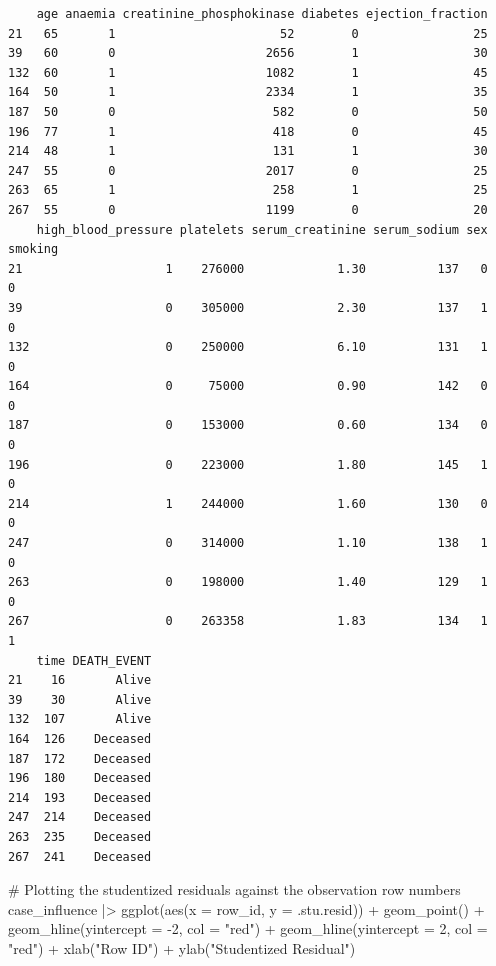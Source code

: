\documentclass[
  letterpaper,
  DIV=11,
  numbers=noendperiod]{scrartcl}
\newenvironment{Shaded}{\begin{snugshade}}{\end{snugshade}}
\newcommand{\AttributeTok}[1]{\textcolor[rgb]{0.40,0.45,0.13}{#1}}
\newcommand{\CommentTok}[1]{\textcolor[rgb]{0.37,0.37,0.37}{#1}}
\newcommand{\DecValTok}[1]{\textcolor[rgb]{0.68,0.00,0.00}{#1}}
\newcommand{\FunctionTok}[1]{\textcolor[rgb]{0.28,0.35,0.67}{#1}}
\newcommand{\NormalTok}[1]{\textcolor[rgb]{0.00,0.23,0.31}{#1}}
\newcommand{\SpecialCharTok}[1]{\textcolor[rgb]{0.37,0.37,0.37}{#1}}
\newcommand{\StringTok}[1]{\textcolor[rgb]{0.13,0.47,0.30}{#1}}
\begin{document}
\begin{verbatim}
    age anaemia creatinine_phosphokinase diabetes ejection_fraction
21   65       1                       52        0                25
39   60       0                     2656        1                30
132  60       1                     1082        1                45
164  50       1                     2334        1                35
187  50       0                      582        0                50
196  77       1                      418        0                45
214  48       1                      131        1                30
247  55       0                     2017        0                25
263  65       1                      258        1                25
267  55       0                     1199        0                20
    high_blood_pressure platelets serum_creatinine serum_sodium sex smoking
21                    1    276000             1.30          137   0       0
39                    0    305000             2.30          137   1       0
132                   0    250000             6.10          131   1       0
164                   0     75000             0.90          142   0       0
187                   0    153000             0.60          134   0       0
196                   0    223000             1.80          145   1       0
214                   1    244000             1.60          130   0       0
247                   0    314000             1.10          138   1       0
263                   0    198000             1.40          129   1       0
267                   0    263358             1.83          134   1       1
    time DEATH_EVENT
21    16       Alive
39    30       Alive
132  107       Alive
164  126    Deceased
187  172    Deceased
196  180    Deceased
214  193    Deceased
247  214    Deceased
263  235    Deceased
267  241    Deceased
\end{verbatim}

\begin{Shaded}
\begin{Highlighting}[]
\CommentTok{\# Plotting the studentized residuals against the observation row numbers}
\NormalTok{case\_influence }\SpecialCharTok{|\textgreater{}}
  \FunctionTok{ggplot}\NormalTok{(}\FunctionTok{aes}\NormalTok{(}\AttributeTok{x =}\NormalTok{ row\_id, }\AttributeTok{y =}\NormalTok{ .stu.resid)) }\SpecialCharTok{+} \FunctionTok{geom\_point}\NormalTok{() }\SpecialCharTok{+} 
  \FunctionTok{geom\_hline}\NormalTok{(}\AttributeTok{yintercept =} \SpecialCharTok{{-}}\DecValTok{2}\NormalTok{, }\AttributeTok{col =} \StringTok{"red"}\NormalTok{) }\SpecialCharTok{+}
  \FunctionTok{geom\_hline}\NormalTok{(}\AttributeTok{yintercept =} \DecValTok{2}\NormalTok{, }\AttributeTok{col =} \StringTok{"red"}\NormalTok{) }\SpecialCharTok{+}
  \FunctionTok{xlab}\NormalTok{(}\StringTok{"Row ID"}\NormalTok{) }\SpecialCharTok{+} \FunctionTok{ylab}\NormalTok{(}\StringTok{"Studentized Residual"}\NormalTok{)}
\end{Highlighting}
\end{Shaded}
\end{document}
